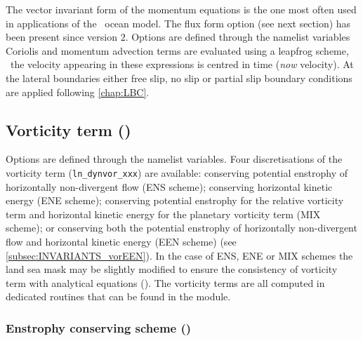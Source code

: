 \documentclass[../main/NEMO_manual]{subfiles}
\begin{document}
The vector invariant form of the momentum equations is the one most often used in
applications of the \NEMO\ ocean model.
The flux form option (see next section) has been present since version $2$.
Options are defined through the  namelist variables Coriolis and
momentum advection terms are evaluated using a leapfrog scheme,
\ie\ the velocity appearing in these expressions is centred in time (\textit{now} velocity).
At the lateral boundaries either free slip, no slip or partial slip boundary conditions are applied following
\autoref{chap:LBC}.

\subsection[Vorticity term (\textit{dynvor.F90})]{Vorticity term (\protect{})}
\label{subsec:DYN_vor}

\begin{listing}
  \caption{}
  \label{lst:namdyn_vor}
\end{listing}

Options are defined through the  namelist variables.
Four discretisations of the vorticity term (\texttt{ln\_dynvor\_xxx}) are available:
conserving potential enstrophy of horizontally non-divergent flow (ENS scheme);
conserving horizontal kinetic energy (ENE scheme);
conserving potential enstrophy for the relative vorticity term and
horizontal kinetic energy for the planetary vorticity term (MIX scheme);
or conserving both the potential enstrophy of horizontally non-divergent flow and horizontal kinetic energy
(EEN scheme) (see \autoref{subsec:INVARIANTS_vorEEN}).
In the case of ENS, ENE or MIX schemes the land sea mask may be slightly modified to ensure the consistency of
vorticity term with analytical equations ().
The vorticity terms are all computed in dedicated routines that can be found in the  module.

\subsubsection[Enstrophy conserving scheme (\forcode{ln_dynvor_ens})]{Enstrophy conserving scheme (\protect{})}
\label{subsec:DYN_vor_ens}
\end{document}
